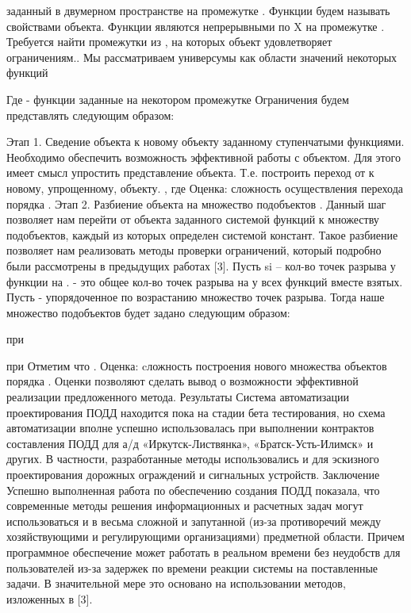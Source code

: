 заданный в двумерном пространстве на промежутке . Функции  будем называть свойствами объекта. Функции  являются непрерывными по X на промежутке . Требуется найти промежутки из , на которых объект удовлетворяет  ограничениям.. Мы рассматриваем универсумы  как области значений некоторых функций

Где  - функции заданные на некотором промежутке  Ограничения будем представлять следующим образом:

Этап 1. Сведение объекта  к новому объекту заданному ступенчатыми функциями. Необходимо обеспечить возможность эффективной работы с объектом. Для этого имеет смысл упростить представление объекта. Т.е. построить переход от  к новому, упрощенному, объекту.
, где 
Оценка: сложность осуществления перехода порядка .
Этап 2. Разбиение объекта  на множество подобъектов . Данный шаг позволяет нам перейти от объекта заданного системой функций к множеству подобъектов, каждый из которых определен системой констант. Такое разбиение позволяет нам реализовать методы проверки ограничений, который подробно были рассмотрены в предыдущих работах [3]. 
	Пусть si – кол-во точек разрыва у функции на . - это общее кол-во точек разрыва на  у всех функций  вместе взятых. Пусть - упорядоченное по возрастанию множество точек разрыва. Тогда наше множество подобъектов будет задано следующим образом:
 
при 
 
при 
Отметим что . 
Оценка: cложность построения нового множества объектов порядка .
Оценки позволяют сделать вывод о возможности эффективной реализации предложенного метода.
Результаты
Система автоматизации проектирования ПОДД находится пока на стадии бета тестирования, но схема автоматизации вполне успешно использовалась при выполнении контрактов составления  ПОДД для а/д  «Иркутск-Листвянка», «Братск-Усть-Илимск» и других. 
В частности, разработанные методы использовались и для эскизного проектирования дорожных ограждений и сигнальных устройств. 
Заключение
Успешно выполненная работа по обеспечению создания ПОДД показала, что современные методы решения информационных и расчетных задач могут использоваться и в весьма сложной и запутанной (из-за противоречий между хозяйствующими и регулирующими организациями) предметной области. Причем программное обеспечение может работать в реальном времени без неудобств для пользователей из-за задержек по времени реакции системы на поставленные задачи. В значительной мере это основано на использовании методов, изложенных в [3].


